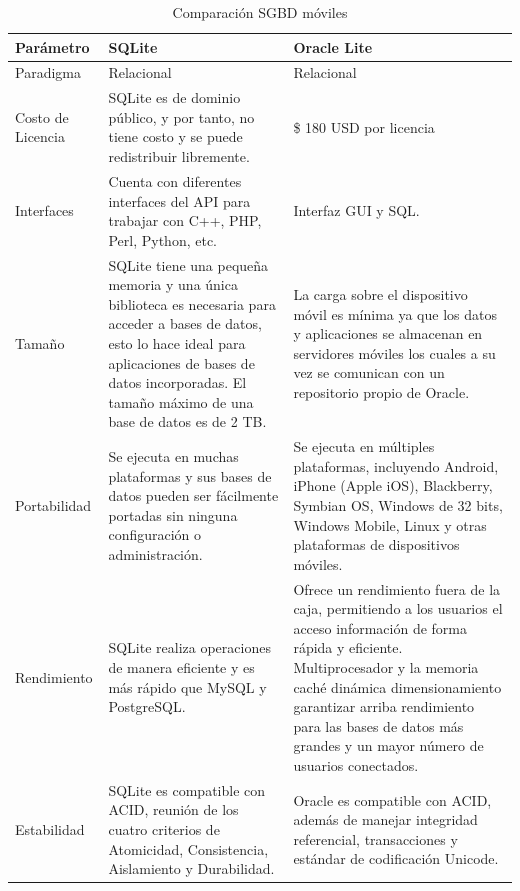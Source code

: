 \begin{table}
	\begin{center}
		\begin{tabular}{|p{3cm}|p{5.1cm}|p{5.1cm}|}
			\hline \rowcolor[RGB]{0,102,204} 
			\textcolor{blanco}{\bf Parámetro} &
				\textcolor{blanco}{\bf SQLite} &
				\textcolor{blanco}{\bf Oracle Lite} \\
			\hline \rowcolor[RGB]{224,224,224} 
				Paradigma &
				Relacional &
				Relacional \\
      		\hline 
      			Costo de Licencia &
				SQLite es de dominio público, y por tanto, no tiene costo y se puede redistribuir libremente. &
				\$ 180 USD por licencia \\
      		\hline \rowcolor[RGB]{224,224,224} 
      			Interfaces &
				Cuenta con diferentes interfaces del API para trabajar con C++, PHP, Perl, Python, etc. &
				Interfaz GUI y SQL. \\
      		\hline 
      			Tamaño &
				SQLite tiene una pequeña memoria y una única biblioteca es necesaria para acceder a bases de datos, esto lo hace ideal para aplicaciones de bases de datos incorporadas. El tamaño máximo de una base de datos es de 2 TB. &
				 La carga sobre el dispositivo móvil es mínima ya que los datos y aplicaciones se almacenan en servidores móviles los cuales a su vez se comunican con un repositorio propio de Oracle. \\
      		\hline \rowcolor[RGB]{224,224,224} 
      		Portabilidad &
      		Se ejecuta en muchas plataformas y sus bases de datos pueden ser fácilmente portadas sin ninguna configuración o administración. &
      		Se ejecuta en múltiples plataformas, incluyendo Android, iPhone (Apple iOS), Blackberry, Symbian OS, Windows de 32 bits, Windows Mobile, Linux y otras plataformas de dispositivos móviles. \\
      		\hline
      		Rendimiento &
      		SQLite realiza operaciones de manera eficiente y es más rápido que MySQL y PostgreSQL. &
      		Ofrece un rendimiento fuera de la caja, permitiendo a los usuarios el acceso información de forma rápida y eficiente. Multiprocesador y la memoria caché dinámica dimensionamiento garantizar arriba rendimiento para las bases de datos más grandes y un mayor número de usuarios conectados. \\ 
      		\hline \rowcolor[RGB]{224,224,224} 
      		Estabilidad &
      		SQLite es compatible con ACID, reunión de los cuatro criterios de Atomicidad, Consistencia, Aislamiento y Durabilidad. &
      		Oracle es compatible con ACID, además de manejar integridad referencial, transacciones y  estándar de codificación Unicode. \\
      		\hline
    		\end{tabular}
	\end{center}
	\caption[Comparación SGBD móviles]{Comparación SGBD móviles} 
	\label{tab:comSGBD}
\end{table}

